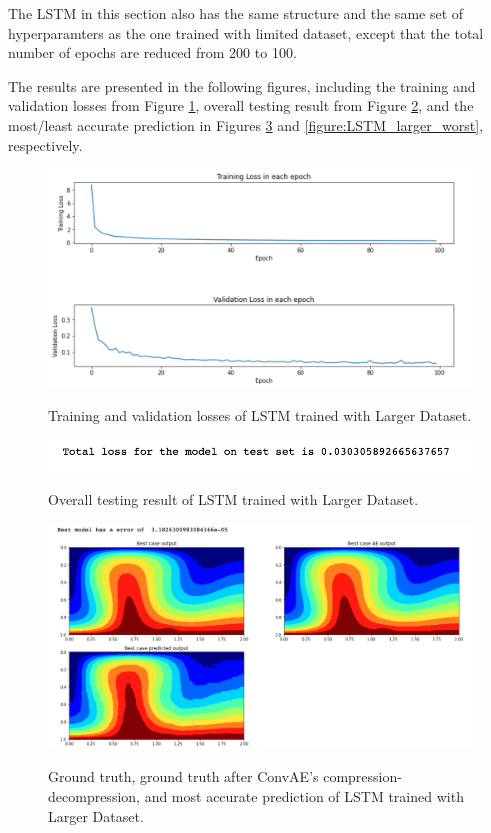 The LSTM in this section also has the same structure and the same set of hyperparamters as the one trained with limited dataset, except that the total number of epochs are reduced from 200 to 100.

The results are presented in the following figures, including the training and validation losses from Figure \ref{figure:LSTM_larger_losses}, overall testing result from Figure \ref{figure:LSTM_larger_testing}, and the most/least accurate prediction in Figures \ref{figure:LSTM_larger_best} and \ref{figure:LSTM_larger_worst}, respectively.

\begin{figure}[H]
    \caption{Training and validation losses of LSTM trained with Larger Dataset.}
    \includegraphics[scale=0.6]{figures/mantle_convection_images/larger_dataset/LSTM_trainingData.png}
    \label{figure:LSTM_larger_losses}
\end{figure}

\begin{figure}[H]
    \caption{Overall testing result of LSTM trained with Larger Dataset.}
    \includegraphics[scale=0.8]{figures/mantle_convection_images/larger_dataset/LSTM_OverallTesting.png}
    \label{figure:LSTM_larger_testing}
\end{figure}

\begin{figure}[H]
    \caption{Ground truth, ground truth after ConvAE's compression-decompression, and most accurate prediction of LSTM trained with Larger Dataset.}
    \includegraphics[scale=0.5]{figures/mantle_convection_images/larger_dataset/LSTM_Best.png}
    \label{figure:LSTM_larger_best}
\end{figure}

